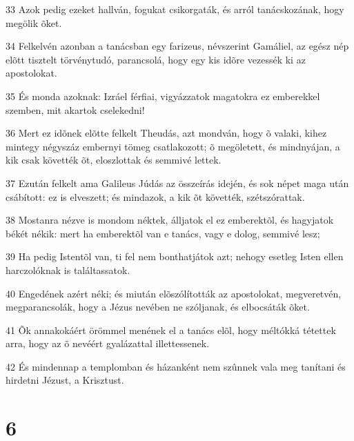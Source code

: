 \par 33 Azok pedig ezeket hallván, fogukat csikorgaták, és arról tanácskozának, hogy megölik õket.
\par 34 Felkelvén azonban a tanácsban egy farizeus, névszerint Gamáliel, az egész nép elõtt tisztelt törvénytudó, parancsolá, hogy egy kis idõre vezessék ki az apostolokat.
\par 35 És monda azoknak: Izráel férfiai, vigyázzatok magatokra ez emberekkel szemben, mit akartok cselekedni!
\par 36 Mert ez idõnek elõtte felkelt Theudás, azt mondván, hogy õ valaki, kihez mintegy négyszáz embernyi tömeg csatlakozott; õ megöletett, és mindnyájan, a kik csak követték õt, eloszlottak és semmivé lettek.
\par 37 Ezután felkelt ama Galileus Júdás az összeírás idején, és sok népet maga után csábított: ez is elveszett; és mindazok, a kik õt követték, szétszórattak.
\par 38 Mostanra nézve is mondom néktek, álljatok el ez emberektõl, és hagyjatok békét nékik: mert ha emberektõl van e tanács, vagy e dolog, semmivé lesz;
\par 39 Ha pedig Istentõl van, ti fel nem bonthatjátok azt; nehogy esetleg Isten ellen harczolóknak is találtassatok.
\par 40 Engedének azért néki; és miután elõszólították az apostolokat, megveretvén, megparancsolák, hogy a Jézus nevében  ne szóljanak, és elbocsáták õket.
\par 41 Õk annakokáért örömmel menének el a tanács elõl, hogy méltókká tétettek arra, hogy az õ nevéért gyalázattal illettessenek.
\par 42 És mindennap a templomban és házanként nem szûnnek vala meg tanítani és hirdetni Jézust, a Krisztust.

\chapter{6}

